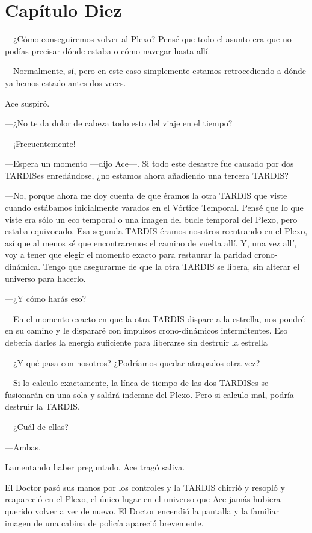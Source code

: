 \chapter*{Capítulo Diez}

---¿Cómo conseguiremos volver al Plexo? Pensé que todo el asunto
era que no podías precisar dónde estaba o cómo navegar hasta allí.

---Normalmente, sí, pero en este caso simplemente estamos
retrocediendo a dónde ya hemos estado antes dos veces.

Ace suspiró.

---¿No te da dolor de cabeza todo esto del viaje en el tiempo?

---¡Frecuentemente!

---Espera un momento ---dijo Ace---. Si todo este desastre fue
causado por dos TARDISes enredándose, ¿no estamos ahora añadiendo una
tercera TARDIS?

---No, porque ahora me doy cuenta de que éramos la otra TARDIS
que viste cuando estábamos inicialmente varados en el Vórtice Temporal.
Pensé que lo que viste era sólo un eco temporal o una imagen del bucle
temporal del Plexo, pero estaba equivocado. Esa segunda TARDIS éramos
nosotros reentrando en el Plexo, así que al menos sé que encontraremos
el camino de vuelta allí. Y, una vez allí, voy a tener que elegir el
momento exacto para restaurar la paridad crono-dinámica. Tengo que
asegurarme de que la otra TARDIS se libera, sin alterar el universo para
hacerlo.

---¿Y cómo harás eso?

---En el momento exacto en que la otra TARDIS dispare a la
estrella, nos pondré en su camino y le dispararé con impulsos
crono-dinámicos intermitentes. Eso debería darles la energía suficiente
para liberarse sin destruir la estrella

---¿Y qué pasa con nosotros? ¿Podríamos quedar atrapados otra
vez?

---Si lo calculo exactamente, la línea de tiempo de las dos
TARDISes se fusionarán en una sola y saldrá indemne del Plexo. Pero si
calculo mal, podría destruir la TARDIS.

---¿Cuál de ellas?

---Ambas.

Lamentando haber preguntado, Ace tragó saliva.

El Doctor pasó sus manos por los controles y la TARDIS chirrió y
resopló y reapareció en el Plexo, el único lugar en el universo que Ace
jamás hubiera querido volver a ver de nuevo. El Doctor encendió la
pantalla y la familiar imagen de una cabina de policía apareció
brevemente.

